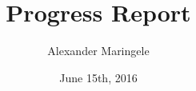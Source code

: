 



\author{Alexander Maringele}
\title{Progress Report
}
\date{June 15th, 2016}

%



\frame[<+->]{
	\maketitle
}

%
%
%


%
%
%
%
%
%
%
%
%
%
%
 
